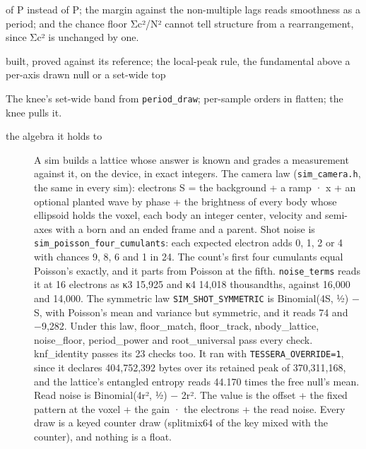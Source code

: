 \begin{description}
of P instead of P; the margin against the non-multiple lags reads smoothness as a period; and the chance floor Σc²/N² cannot tell structure from a rearrangement, since Σc² is unchanged by one.
\item[{status}] built, proved against its reference; the local-peak rule, the fundamental above a per-axis drawn null or a set-wide top
\item[{next}] The knee's set-wide band from \texttt{period\_\allowbreak{}draw}; per-sample orders in flatten; the knee pulls it.
\end{description}

\begin{description}
\item[{the algebra it holds to}] A sim builds a lattice whose answer is known and grades a measurement against it, on the device, in exact integers. The camera law (\texttt{sim\_\allowbreak{}camera.\allowbreak{}h}, the same in every sim): electrons S = the background + a ramp · x + an optional planted wave by phase + the brightness of every body whose ellipsoid holds the voxel, each body an integer center, velocity and semi-axes with a born and an ended frame and a parent. Shot noise is \texttt{sim\_\allowbreak{}poisson\_\allowbreak{}four\_\allowbreak{}cumulants}: each expected electron adds 0, 1, 2 or 4 with chances 9, 8, 6 and 1 in 24. The count's first four cumulants equal Poisson's exactly, and it parts from Poisson at the fifth. \texttt{noise\_\allowbreak{}terms} reads it at 16 electrons as κ3 15,925 and κ4 14,018 thousandths, against 16,000 and 14,000. The symmetric law \texttt{SIM\_\allowbreak{}SHOT\_\allowbreak{}SYMMETRIC} is Binomial(4S, ½) − S, with Poisson's mean and variance but symmetric, and it reads 74 and −9,282. Under this law, floor\_\allowbreak{}match, floor\_\allowbreak{}track, nbody\_\allowbreak{}lattice, noise\_\allowbreak{}floor, period\_\allowbreak{}power and root\_\allowbreak{}universal pass every check. knf\_\allowbreak{}identity passes its 23 checks too. It ran with \texttt{TESSERA\_\allowbreak{}OVERRIDE=1}, since it declares 404,752,392 bytes over its retained peak of 370,311,168, and the lattice's entangled entropy reads 44.170 times the free null's mean. Read noise is Binomial(4r², ½) − 2r². The value is the offset + the fixed pattern at the voxel + the gain · the electrons + the read noise. Every draw is a keyed counter draw (splitmix64 of the key mixed with the counter), and nothing is a float.

\end{description}
